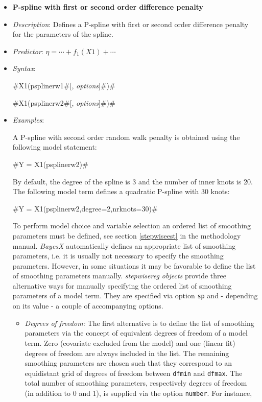 \begin{itemize}
\item[] {\bf\sffamily P-spline with first or second order difference penalty}
\label{psplines_stepwise}

\item[] {\em Description}: Defines a P-spline with first or second
order difference penalty for the parameters of the spline.
\item[] {\em Predictor}: $\eta =  \cdots + f_1(X1) + \cdots$
\item[] {\em Syntax}:

#X1(psplinerw1#[, {\em options}]#)#

#X1(psplinerw2#[, {\em options}]#)#
\item[] {\em Examples}:

A P-spline with second order random walk penalty is
obtained using the following model statement:

#Y = X1(psplinerw2)#

By default, the degree of the spline is 3 and the number of inner
knots is 20. The following model term defines a quadratic P-spline
with 30 knots:

#Y = X1(psplinerw2,degree=2,nrknots=30)#

To perform model choice and variable selection an ordered list of smoothing parameters must be defined, see
section \autoref{stepwiseest}
in the methodology manual. {\em BayesX} automatically defines an appropriate list of smoothing parameters, i.e. it
is usually not necessary to  specify the smoothing parameters. However, in some situations it may be favorable to
define the list of smoothing parameters manually. {\em stepwisereg objects} provide three alternative ways for
manually specifying the ordered list of smoothing parameters of a model term. They are specified via option
{\tt sp} and - depending on its value - a couple of accompanying options.

\begin{itemize}
\item {\em Degrees of freedom:} The first alternative is to define the list of  smoothing parameters via the concept of
equivalent degrees of freedom of a model term. Zero (covariate excluded from the model) and one (linear fit)
degrees of freedom are always included in the list. The remaining smoothing parameters  are chosen such that they
correspond to an equidistant grid of degrees of freedom between {\tt dfmin} and {\tt dfmax}. The total
number of smoothing parameters, respectively degrees of freedom (in addition to 0 and 1), is supplied via the option {\tt number}.
For instance,


\end{itemize}
\end{itemize}
